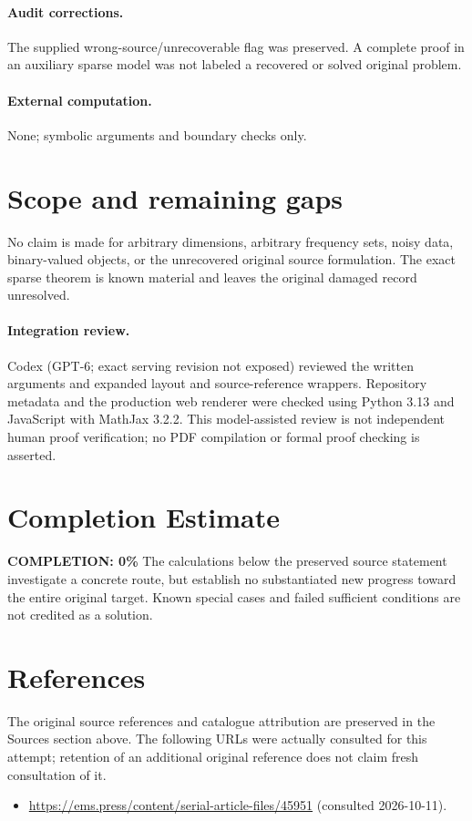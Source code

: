 \documentclass[11pt]{article}
\begin{document}
\paragraph{Audit corrections.} The supplied wrong-source/unrecoverable flag was preserved. A complete proof in an auxiliary sparse model was not labeled a recovered or solved original problem.
\paragraph{External computation.} None; symbolic arguments and boundary checks only.
\section{Scope and remaining gaps}
No claim is made for arbitrary dimensions, arbitrary frequency sets, noisy data, binary-valued objects, or the unrecovered original source formulation. The exact sparse theorem is known material and leaves the original damaged record unresolved.
\paragraph{Integration review.} Codex (GPT-6; exact serving revision not exposed) reviewed the written arguments and expanded layout and source-reference wrappers. Repository metadata and the production web renderer were checked using Python 3.13 and JavaScript with MathJax 3.2.2. This model-assisted review is not independent human proof verification; no PDF compilation or formal proof checking is asserted.

\section{Completion Estimate}
\noindent\textbf{COMPLETION: 0\%}
The calculations below the preserved source statement investigate a concrete route,
but establish no substantiated new progress toward the entire original target.
Known special cases and failed sufficient conditions are not credited as a solution.
\section{References}
The original source references and catalogue attribution are preserved in the
Sources section above. The following URLs were actually consulted for this attempt;
retention of an additional original reference does not claim fresh consultation of it.
\begin{itemize}
\item \url{https://ems.press/content/serial-article-files/45951} (consulted 2026-10-11). 
\end{itemize}
\end{document}
